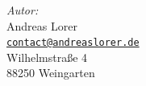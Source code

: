 \begin{titlepage}
\begin{center}
    \begin{flushleft}\large
	  \hspace*{2cm} \emph{Autor:}\\
	  \hspace*{2cm} Andreas Lorer\\
	  \hspace*{2cm} \href{mailto:contact@andreaslorer.de}{\nolinkurl{contact@andreaslorer.de}}\\
      \hspace*{2cm} Wilhelmstraße 4\\
      \hspace*{2cm} 88250 Weingarten
    \end{flushleft}
   \end{center}
   \vfill
\end{titlepage}
